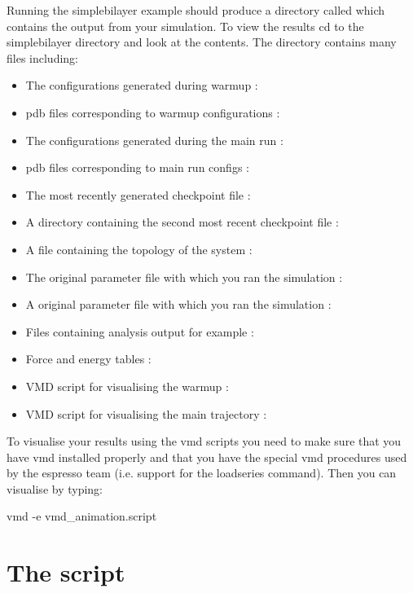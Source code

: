 Running the simplebilayer example should produce a directory called  which contains the output from your simulation. To view the results cd to the simplebilayer directory and look at the contents. The directory contains many files including:

\begin{itemize}
  \item The configurations generated during warmup : 
  \item pdb files corresponding to warmup configurations : 
  \item The configurations generated during the main run : 
  \item pdb files corresponding to main run configs : 
  \item The most recently generated checkpoint file : 
  \item A directory containing the second most recent checkpoint file : 
  \item A file containing the topology of the system : 
  \item The original parameter file with which you ran the simulation : 
  \item A original parameter file with which you ran the simulation : 
  \item Files containing analysis output for example : 
  \item Force and energy tables : 
  \item VMD script for visualising the warmup : 
  \item VMD script for visualising the main trajectory : 
\end{itemize}

 To visualise your results using the vmd scripts you need to make sure that you have vmd installed properly and that you have the special vmd procedures used by the espresso team (i.e. support for the loadseries command). Then you can visualise by typing:

\begin{code}
  vmd -e vmd_animation.script
\end{code}  

\section{The  script}

